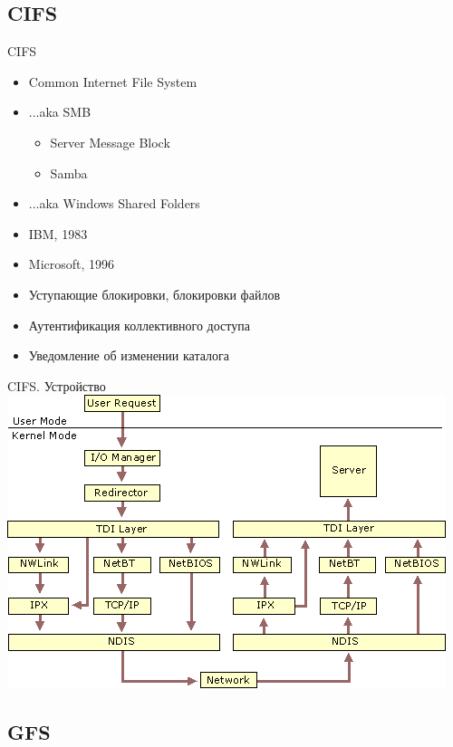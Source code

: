 \documentclass[sans]{beamer}
\begin{document}
\subsection{CIFS}

\begin{frame}{CIFS}
	\begin{itemize}
		\item Common Internet File System
		\item ...aka SMB
		\begin{itemize}
			\item Server Message Block
			\item Samba
		\end{itemize}
		\item ...aka Windows Shared Folders
		\item IBM, 1983
		\item Microsoft, 1996
		\item Уступающие блокировки, блокировки файлов
		\item Аутентификация коллективного доступа
		\item Уведомление об изменении каталога
	\end{itemize}
\end{frame}

\begin{frame}{CIFS. Устройство}
	\includegraphics[width = \linewidth]{images/cifs.png}
\end{frame}

\subsection{GFS}
\end{document}
